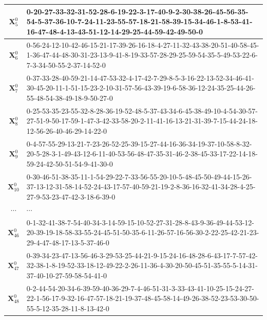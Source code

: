 {{\begin{enumerate}[align = left, left = 0cm, nolistsep]
\begin{enumerate}[label = (\alph*), align = left, left = 0cm, nolistsep]
{\begin{tabularx}{\textwidth}{|c|p{11cm}|}
                                $\boldsymbol{X}_{5}^{0}$  & 0-20-27-33-32-31-52-28-6-19-22-3-17-40-9-2-30-38-26-45-56-35-54-5-37-36-10-7-24-11-23-55-57-18-21-58-39-15-34-46-1-8-53-41-16-47-48-4-13-43-51-12-14-29-25-44-59-42-49-50-0 \\ \hline
                                $\boldsymbol{X}_{6}^{0}$  & 0-56-24-12-10-42-46-15-21-17-39-26-16-18-4-27-11-32-43-38-20-51-40-58-45-1-36-47-44-48-30-31-23-13-9-41-8-19-33-57-28-29-25-59-54-35-5-49-53-22-6-7-3-34-50-55-2-37-14-52-0 \\ \hline
                                $\boldsymbol{X}_{7}^{0}$  & 0-37-33-28-40-59-21-14-47-53-32-4-17-42-7-29-8-5-3-16-22-13-52-34-46-41-30-45-20-11-1-51-15-23-2-10-31-57-56-43-39-19-6-58-36-12-24-35-25-44-26-55-48-54-38-49-18-9-50-27-0 \\ \hline
                                $\boldsymbol{X}_{8}^{0}$  & 0-25-53-35-23-55-32-8-28-36-19-52-48-5-37-43-34-6-45-38-49-10-4-54-30-57-27-51-9-50-17-59-1-47-3-42-33-58-20-2-11-41-16-13-21-31-39-7-15-44-24-18-12-56-26-40-46-29-14-22-0 \\ \hline
                                $\boldsymbol{X}_{9}^{0}$  & 0-4-57-55-29-13-21-7-23-26-52-25-39-15-27-44-16-36-34-19-37-10-58-8-32-20-5-28-3-1-49-43-12-6-11-40-53-56-48-47-35-31-46-2-38-45-33-17-22-14-18-59-24-42-50-51-54-9-41-30-0 \\ \hline
                                $\boldsymbol{X}_{10}^{0}$ & 0-30-46-51-38-35-11-1-54-29-22-7-33-56-55-20-10-5-48-45-50-49-44-15-26-37-13-12-31-58-14-52-24-43-17-57-40-59-21-19-2-8-36-16-32-41-34-28-4-25-27-9-53-23-47-42-3-18-6-39-0 \\ \hline
                                $\cdots$     & $\cdots$                                                                                                                                                                    \\ \hline
                                $\boldsymbol{X}_{46}^{0}$ & 0-1-32-41-38-7-54-40-34-3-14-59-15-10-52-27-31-28-8-43-9-36-49-44-53-12-20-39-19-18-58-33-55-24-45-51-50-35-6-11-26-57-16-56-30-2-22-25-42-21-23-29-4-47-48-17-13-5-37-46-0 \\ \hline
                                $\boldsymbol{X}_{47}^{0}$ & 0-39-34-23-47-13-56-46-3-29-53-25-44-21-9-15-24-16-48-28-6-43-17-7-57-42-32-38-1-8-19-52-33-18-12-49-22-2-26-11-36-4-30-20-50-45-51-35-55-5-14-31-37-40-10-27-59-58-54-41-0 \\ \hline
                                $\boldsymbol{X}_{48}^{0}$ & 0-2-44-54-20-34-6-39-59-40-36-29-7-4-46-51-31-3-33-43-41-10-25-15-24-27-22-1-56-17-9-32-16-47-57-18-21-19-37-48-45-58-14-49-26-38-52-23-53-30-50-55-5-12-35-28-11-8-13-42-0 \\ \hline

\end{tabularx}}
\end{enumerate}
\end{enumerate}}}
